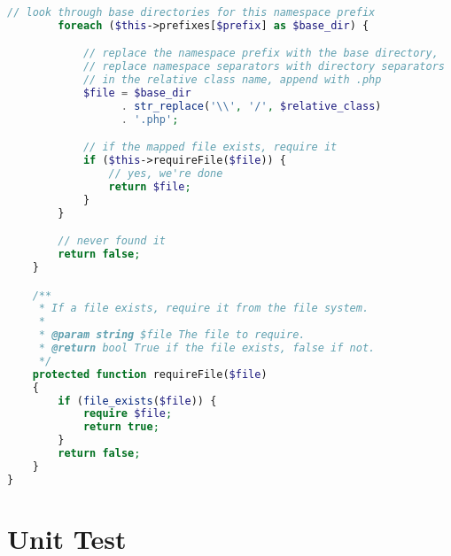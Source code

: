 \begin{lstlisting}[language=PHP]
        // look through base directories for this namespace prefix
        foreach ($this->prefixes[$prefix] as $base_dir) {

            // replace the namespace prefix with the base directory,
            // replace namespace separators with directory separators
            // in the relative class name, append with .php
            $file = $base_dir
                  . str_replace('\\', '/', $relative_class)
                  . '.php';

            // if the mapped file exists, require it
            if ($this->requireFile($file)) {
                // yes, we're done
                return $file;
            }
        }

        // never found it
        return false;
    }

    /**
     * If a file exists, require it from the file system.
     *
     * @param string $file The file to require.
     * @return bool True if the file exists, false if not.
     */
    protected function requireFile($file)
    {
        if (file_exists($file)) {
            require $file;
            return true;
        }
        return false;
    }
}
\end{lstlisting}

\section{Unit Test}




